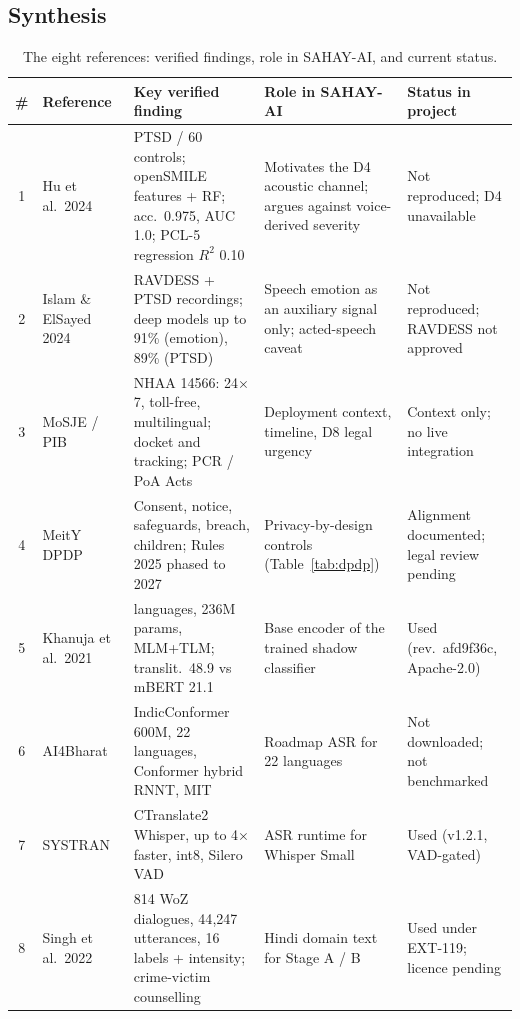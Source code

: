 \documentclass[11pt,a4paper]{article}
\newcommand{\codeus}{\textunderscore\allowbreak}
\DeclareRobustCommand{\code}[1]{{\ttfamily\let\_\codeus #1}}
\begin{document}
\subsection{Synthesis}
\begin{table}[!htbp]
\centering\footnotesize
\caption{The eight references: verified findings, role in SAHAY-AI, and current status.}
\label{tab:refs}
\begin{tabularx}{\linewidth}{@{}c>{\raggedright\arraybackslash}p{2.6cm}>{\raggedright\arraybackslash}X>{\raggedright\arraybackslash}p{3.3cm}>{\raggedright\arraybackslash}p{3.0cm}@{}}
\toprule
\# & Reference & Key verified finding & Role in SAHAY-AI & Status in project \\
\midrule
1 & Hu et al.\ 2024~\cite{hu2024} & 76 PTSD / 60 controls; openSMILE features + RF; acc.\ 0.975, AUC 1.0; PCL-5 regression $R^2$ 0.10 & Motivates the D4 acoustic channel; argues against voice-derived severity & Not reproduced; D4 unavailable \\
2 & Islam \& ElSayed 2024~\cite{islam2024} & RAVDESS + PTSD recordings; deep models up to 91\% (emotion), 89\% (PTSD) & Speech emotion as an auxiliary signal only; acted-speech caveat & Not reproduced; RAVDESS not approved \\
3 & MoSJE / PIB~\cite{pib2021} & NHAA 14566: 24$\times$7, toll-free, multilingual; docket and tracking; PCR / PoA Acts & Deployment context, timeline, D8 legal urgency & Context only; no live integration \\
4 & MeitY DPDP~\cite{meity2023} & Consent, notice, safeguards, breach, children; Rules 2025 phased to 2027 & Privacy-by-design controls (Table~\ref{tab:dpdp}) & Alignment documented; legal review pending \\
5 & Khanuja et al.\ 2021~\cite{khanuja2021} & 17 languages, 236M params, MLM+TLM; translit.\ 48.9 vs mBERT 21.1 & Base encoder of the trained shadow classifier & Used (rev.\ \code{afd9f36c}, Apache-2.0) \\
6 & AI4Bharat~\cite{ai4bharat} & IndicConformer 600M, 22 languages, Conformer hybrid RNNT, MIT & Roadmap ASR for 22 languages & Not downloaded; not benchmarked \\
7 & SYSTRAN~\cite{systran} & CTranslate2 Whisper, up to 4$\times$ faster, int8, Silero VAD & ASR runtime for Whisper Small & Used (v1.2.1, VAD-gated) \\
8 & Singh et al.\ 2022~\cite{singh2022} & 1{,}814 WoZ dialogues, 44{,}247 utterances, 16 labels + intensity; crime-victim counselling & Hindi domain text for Stage A / B & Used under EXT-119; licence pending \\
\bottomrule
\end{tabularx}
\end{table}
\end{document}

